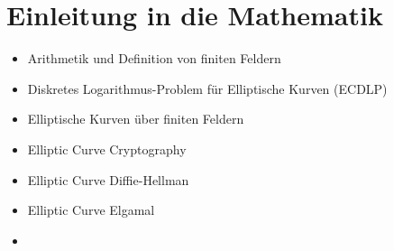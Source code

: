 \chapter{Einleitung in die Mathematik}

\begin{itemize}
	\item Arithmetik und Definition von finiten Feldern
	\item Diskretes Logarithmus-Problem für Elliptische Kurven (ECDLP)
	\item Elliptische Kurven über finiten Feldern
	\item Elliptic Curve Cryptography
	\item Elliptic Curve Diffie-Hellman
	\item Elliptic Curve Elgamal
	\item 
\end{itemize}


